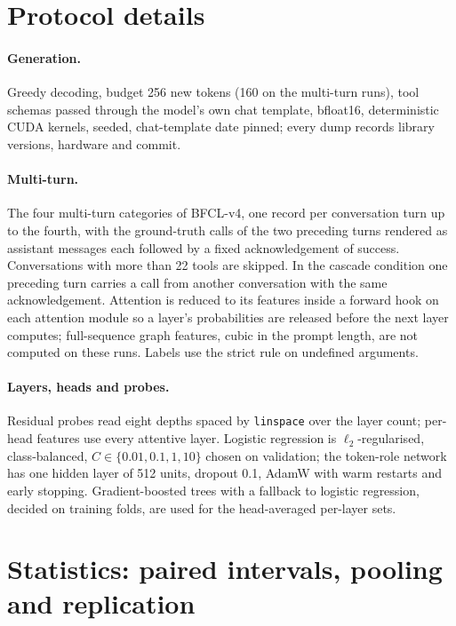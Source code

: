 \section{Protocol details}
\label{app:protocol}

\paragraph{Generation.} Greedy decoding, budget 256 new tokens (160 on the multi-turn runs), tool schemas
passed through the model's own chat template, bfloat16, deterministic CUDA kernels, seeded, chat-template date
pinned; every dump records library versions, hardware and commit.

\paragraph{Multi-turn.} The four multi-turn categories of BFCL-v4, one record per conversation turn up to the
fourth, with the ground-truth calls of the two preceding turns rendered as assistant messages each followed by
a fixed acknowledgement of success. Conversations with more than 22 tools are skipped. In the cascade
condition one preceding turn carries a call from another conversation with the same acknowledgement.
Attention is reduced to its features inside a forward hook on each attention module so a layer's
probabilities are released before the next layer computes; full-sequence graph features, cubic in the prompt
length, are not computed on these runs. Labels use the strict rule on undefined arguments.

\paragraph{Layers, heads and probes.} Residual probes read eight depths spaced by \texttt{linspace} over the
layer count; per-head features use every attentive layer. Logistic regression is $\ell_2$-regularised,
class-balanced, $C\in\{0.01,0.1,1,10\}$ chosen on validation; the token-role network has one hidden layer of
512 units, dropout 0.1, AdamW with warm restarts and early stopping. Gradient-boosted trees with a fallback to
logistic regression, decided on training folds, are used for the head-averaged per-layer sets.

\section{Statistics: paired intervals, pooling and replication}
\label{app:stats}
\label{sec:exp:stats}

